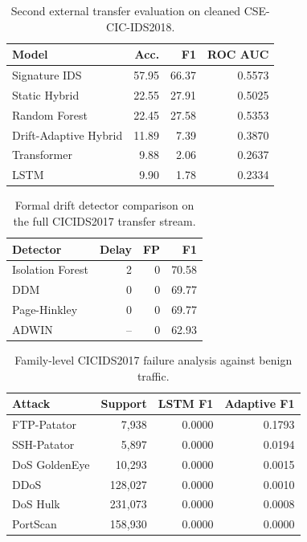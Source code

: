 \documentclass[conference]{IEEEtran}
\begin{document}
\begin{table}[t]
\caption{Second external transfer evaluation on cleaned CSE-CIC-IDS2018.}
\label{tab:cse}
\centering
\small
\begin{tabular}{@{}lrrr@{}}
\toprule
Model & Acc. & F1 & ROC AUC \\
\midrule
Signature IDS & 57.95 & 66.37 & 0.5573 \\
Static Hybrid & 22.55 & 27.91 & 0.5025 \\
Random Forest & 22.45 & 27.58 & 0.5353 \\
Drift-Adaptive Hybrid & 11.89 & 7.39 & 0.3870 \\
Transformer & 9.88 & 2.06 & 0.2637 \\
LSTM & 9.90 & 1.78 & 0.2334 \\
\bottomrule
\end{tabular}
\end{table}

\begin{table}[t]
\caption{Formal drift detector comparison on the full CICIDS2017 transfer stream.}
\label{tab:detectors}
\centering
\small
\begin{tabular}{@{}lrrr@{}}
\toprule
Detector & Delay & FP & F1 \\
\midrule
Isolation Forest & 2 & 0 & 70.58 \\
DDM & 0 & 0 & 69.77 \\
Page-Hinkley & 0 & 0 & 69.77 \\
ADWIN & -- & 0 & 62.93 \\
\bottomrule
\end{tabular}
\end{table}

\begin{table}[t]
\caption{Family-level CICIDS2017 failure analysis against benign traffic.}
\label{tab:failure}
\centering
\scriptsize
\begin{tabular}{@{}p{1.45cm}rrr@{}}
\toprule
Attack & Support & LSTM F1 & Adaptive F1 \\
\midrule
FTP-Patator & 7{,}938 & 0.0000 & 0.1793 \\
SSH-Patator & 5{,}897 & 0.0000 & 0.0194 \\
DoS GoldenEye & 10{,}293 & 0.0000 & 0.0015 \\
DDoS & 128{,}027 & 0.0000 & 0.0010 \\
DoS Hulk & 231{,}073 & 0.0000 & 0.0008 \\
PortScan & 158{,}930 & 0.0000 & 0.0000 \\
\bottomrule
\end{tabular}
\end{table}
\end{document}
